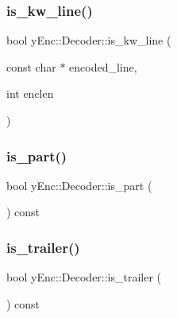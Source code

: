 \hypertarget{classy_enc_1_1_decoder_accc08e169257c8b6f4296542d2840bdb}{}\label{classy_enc_1_1_decoder_accc08e169257c8b6f4296542d2840bdb} 
\subsubsection{\texorpdfstring{is\+\_\+kw\+\_\+line()}{is\_kw\_line()}}
{\footnotesize\ttfamily bool y\+Enc\+::\+Decoder\+::is\+\_\+kw\+\_\+line (\begin{DoxyParamCaption}\item[{const char $\ast$}]{encoded\+\_\+line,  }\item[{int}]{enclen }\end{DoxyParamCaption})\hspace{0.3cm}{\ttfamily [protected]}}

\hypertarget{classy_enc_1_1_decoder_ab5c40f5cf7b55ac3ae4e0137b6aa8b7c}{}\label{classy_enc_1_1_decoder_ab5c40f5cf7b55ac3ae4e0137b6aa8b7c} 
\subsubsection{\texorpdfstring{is\+\_\+part()}{is\_part()}}
{\footnotesize\ttfamily bool y\+Enc\+::\+Decoder\+::is\+\_\+part (\begin{DoxyParamCaption}{ }\end{DoxyParamCaption}) const\hspace{0.3cm}{\ttfamily [inline]}}

\hypertarget{classy_enc_1_1_decoder_a555b5d3f2e3adcdb91d56bcec459871d}{}\label{classy_enc_1_1_decoder_a555b5d3f2e3adcdb91d56bcec459871d} 
\subsubsection{\texorpdfstring{is\+\_\+trailer()}{is\_trailer()}}
{\footnotesize\ttfamily bool y\+Enc\+::\+Decoder\+::is\+\_\+trailer (\begin{DoxyParamCaption}{ }\end{DoxyParamCaption}) const\hspace{0.3cm}{\ttfamily [inline]}}

